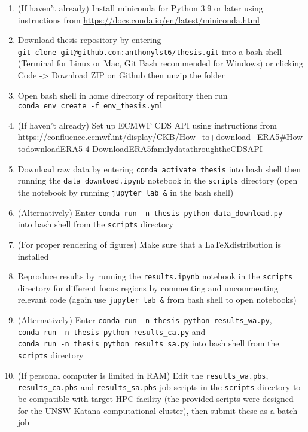 \begin{enumerate}
	\item (If haven't already) Install miniconda for Python 3.9 or later using instructions from \url{https://docs.conda.io/en/latest/miniconda.html}
	\item Download thesis repository by entering \\ \verb+git clone git@github.com:anthonylst6/thesis.git+ into a bash shell (Terminal for Linux or Mac, Git Bash recommended for Windows) or clicking Code -> Download ZIP on Github then unzip the folder
	\item Open bash shell in home directory of repository then run \\ \verb+conda env create -f env_thesis.yml+
	\item (If haven't already) Set up ECMWF CDS API using instructions from \url{https://confluence.ecmwf.int/display/CKB/How+to+download+ERA5#HowtodownloadERA5-4-DownloadERA5familydatathroughtheCDSAPI}
	\item Download raw data by entering \verb+conda activate thesis+ into bash shell then running the \verb+data_download.ipynb+ notebook in the \verb+scripts+ directory (open the notebook by running \verb+jupyter lab &+ in the bash shell)
	\item (Alternatively) Enter \verb+conda run -n thesis python data_download.py+ \\ into bash shell from the \verb+scripts+ directory
	\item (For proper rendering of figures) Make sure that a \LaTeX distribution is installed
	\item Reproduce results by running the \verb+results.ipynb+ notebook in the \verb+scripts+ directory for different focus regions by commenting and uncommenting relevant code (again use \verb+jupyter lab &+ from bash shell to open notebooks)
	\item (Alternatively) Enter \verb+conda run -n thesis python results_wa.py+, \\ \verb+conda run -n thesis python results_ca.py+ and \\ \verb+conda run -n thesis python results_sa.py+ into bash shell from the \\ \verb+scripts+ directory
	\item (If personal computer is limited in RAM) Edit the \verb+results_wa.pbs+, \\ \verb+results_ca.pbs+ and \verb+results_sa.pbs+ job scripts in the \verb+scripts+ directory to be compatible with target HPC facility (the provided scripts were designed for the UNSW Katana computational cluster), then submit these as a batch job
\end{enumerate}

